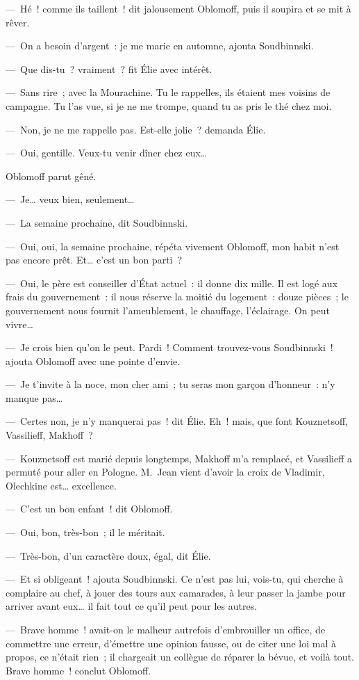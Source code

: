 \documentclass[french,twoside]{book} %
\begin{document}
— Hé ! comme ils taillent ! dit jalousement Oblomoff, puis il soupira et se mit à rêver.\par
— On a besoin d’argent : je me marie en automne, ajouta Soudbinnski.\par
— Que dis-tu ? vraiment ? fit Élie avec intérêt.\par
— Sans rire ; avec la Mourachine. Tu le rappelles, ils étaient mes voisins de campagne. Tu l’as vue, si je ne me trompe, quand tu as pris le thé chez moi.\par
— Non, je ne me rappelle pas. Est-elle jolie ? demanda Élie.\par
— Oui, gentille. Veux-tu venir dîner chez eux…\par
Oblomoff parut gêné.\par
— Je… veux bien, seulement…\par
— La semaine prochaine, dit Soudbinnski.\par
— Oui, oui, la semaine prochaine, répéta vivement Oblomoff, mon habit n’est pas encore prêt. Et… c’est un bon parti ?\par
— Oui, le père est conseiller d’État actuel : il donne dix mille. Il est logé aux frais du gouvernement : il nous réserve la moitié du logement : douze pièces ; le gouvernement nous fournit l’ameublement, le chauffage, l’éclairage. On peut vivre…\par
— Je crois bien qu’on le peut. Pardi ! Comment trouvez-vous Soudbinnski ! ajouta Oblomoff avec une pointe d’envie.\par
— Je t’invite à la noce, mon cher ami ; tu seras mon garçon d’honneur : n’y manque pas…\par
— Certes non, je n’y manquerai pas ! dit Élie. Eh ! mais, que font Kouznetsoff, Vassilieff, Makhoff ?\par
— Kouznetsoff est marié depuis longtemps, Makhoff m’a remplacé, et Vassilieff a permuté pour aller en Pologne. M. Jean vient d’avoir la croix de Vladimir, Olechkine est… excellence.\par
— C’est un bon enfant ! dit Oblomoff.\par
— Oui, bon, très-bon ; il le méritait.\par
— Très-bon, d’un caractère doux, égal, dit Élie.\par
— Et si obligeant ! ajouta Soudbinnski. Ce n’est pas lui, vois-tu, qui cherche à complaire au chef, à jouer des tours aux camarades, à leur passer la jambe pour arriver avant eux… il fait tout ce qu’il peut pour les autres.\par
— Brave homme ! avait-on le malheur autrefois d’embrouiller un office, de commettre une erreur, d’émettre une opinion fausse, ou de citer une loi mal à propos, ce n’était rien ; il chargeait un collègue de réparer la bévue, et voilà tout. Brave homme ! conclut Oblomoff.\par
\end{document}
